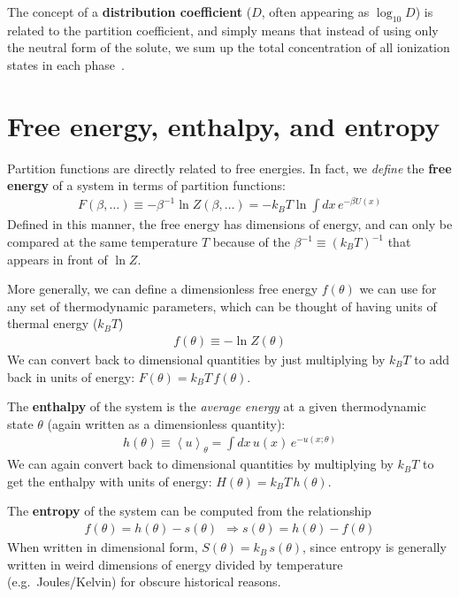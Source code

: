 \documentclass[english,course]{lecture}
\begin{document}
The concept of a {\bf distribution coefficient} ($D$, often appearing as $\log_{10} D$) is related to the partition coefficient, and simply means that instead of using only the neutral form of the solute, we sum up the total concentration of all ionization states in each phase~\cite{rustenburg2016measuring}.

\vfill

\section{Free energy, enthalpy, and entropy}

Partition functions are directly related to free energies.
In fact, we \emph{define} the {\bf free energy} of a system in terms of partition functions:
\begin{eqnarray}
F(\beta, \ldots) \equiv - \beta^{-1} \ln Z(\beta, \ldots) = - k_B T \ln \int dx \, e^{-\beta U(x)}
\end{eqnarray}
Defined in this manner, the free energy has dimensions of energy, and can only be compared at the same temperature $T$ because of the $\beta^{-1} \equiv (k_B T)^{-1}$ that appears in front of $\ln Z$.

More generally, we can define a dimensionless free energy $f(\theta)$ we can use for any set of thermodynamic parameters, which can be thought of having units of thermal energy ($k_B T$)
\begin{eqnarray}
f(\theta) \equiv - \ln Z(\theta)
\end{eqnarray}
We can convert back to dimensional quantities by just multiplying by $k_B T$ to add back in units of energy: $F(\theta) = k_B T \, f(\theta)$.

The {\bf enthalpy} of the system is the \emph{average energy} at a given thermodynamic state $\theta$ (again written as a dimensionless quantity):
\begin{eqnarray}
h(\theta) \equiv \left< u \right>_\theta = \int dx \, u(x) \, e^{-u(x; \theta)}
\end{eqnarray}
We can again convert back to dimensional quantities by multiplying by $k_B T$ to get the enthalpy with units of energy: $H(\theta) = k_B T \, h(\theta)$.

The {\bf entropy} of the system can be computed from the relationship
\begin{eqnarray}
f(\theta) = h(\theta) - s(\theta) \:\: \Rightarrow s(\theta) = h(\theta) - f(\theta) \label{equation:reduced-entropy-relationship}
\end{eqnarray}
When written in dimensional form, $S(\theta) = k_B \, s(\theta)$, since entropy is generally written in weird dimensions of energy divided by temperature (e.g.\ Joules/Kelvin) for obscure historical reasons.
\end{document}
